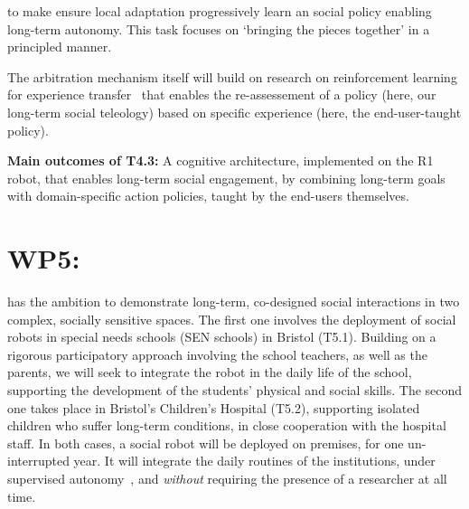 to make ensure local adaptation  progressively learn an social
policy enabling long-term autonomy. This task focuses on `bringing the pieces
together' in a principled manner.


The arbitration mechanism itself will build on research on reinforcement
learning for experience transfer~\cite{madden2004transfer} that enables the
re-assessement of a policy (here, our long-term social teleology) based on
specific experience (here, the end-user-taught policy).


\begin{framed}
    {\noindent\bf Main outcomes of T4.3:} A cognitive architecture, implemented
    on the R1 robot, that enables long-term social engagement, by combining
    long-term goals with domain-specific action policies, taught by the
    end-users themselves.
\end{framed}



\section{WP5: \textbf{\wpFive}}

\project has the ambition to demonstrate long-term, co-designed social
interactions in two complex, socially sensitive spaces.
The first one involves the deployment of social robots in special needs schools
(SEN schools) in Bristol (T5.1). Building on a rigorous participatory approach
involving the school teachers, as well as the parents, we will seek to integrate
the robot in the daily life of the school, supporting the development of the
students' physical and social skills. The second one takes place in Bristol's
Children's Hospital (T5.2), supporting isolated children who suffer long-term
conditions, in close cooperation with the hospital staff. In both cases, a
social robot will be deployed on premises, for one un-interrupted year. It will
integrate the daily routines of the institutions, under supervised
autonomy~\cite{senft2017supervised}, and \emph{without} requiring the
presence of a researcher at all time.

